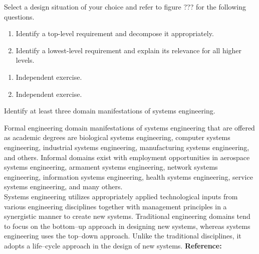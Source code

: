 \begin{exercises}
    \begin{exercise}
    \label{sea-2-18_20}
        Select a design situation of your choice and refer to figure ??? for the following questions.
        \begin{enumerate}[label=\alph*)]
            \item Identify a top-level requirement and decompose it appropriately.
            \item Identify a lowest-level requirement and explain its relevance for all higher levels.
        \end{enumerate}
    \end{exercise}
    \begin{solution}
        \begin{enumerate}[label=\alph*)]
            \item Independent exercise.
            \item Independent exercise.
        \end{enumerate}
    \end{solution}
    
    \begin{exercise}
    \label{sea-2-22}
        Identify at least three domain manifestations of systems engineering.
    \end{exercise}
    \begin{solution}
        Formal engineering domain manifestations of systems engineering that are offered as academic degrees are biological systems engineering, computer systems engineering, industrial systems engineering, manufacturing systems engineering, and others. Informal domains exist with employment opportunities in aerospace systems engineering, armament systems engineering, network systems engineering, information systems engineering, health systems engineering, service systems engineering, and many others. \\
        Systems engineering utilizes appropriately applied technological inputs from various engineering disciplines together with management principles in a synergistic manner to create new systems. Traditional engineering domains tend to focus on the bottom–up approach in designing new systems, whereas systems engineering uses the top–down approach. Unlike the traditional disciplines, it adopts a life–cycle approach in the design of new systems. \textbf{Reference:}
    \end{solution}
    

\end{exercises}
